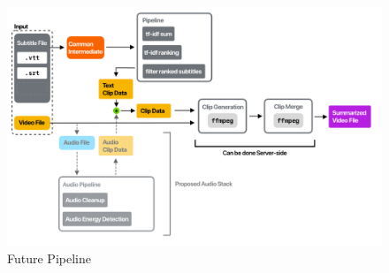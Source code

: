 \documentclass{article}
\begin{document}
		\begin{figure}[ht]
			\centering
				\includegraphics[width=\textwidth, keepaspectratio=true]{Future}	
				\caption{Future Pipeline}
				\label{futurepipeline}
		\end{figure}
	
	
\end{document}
